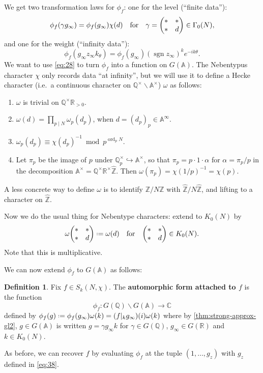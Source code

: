 \documentclass[11pt]{report}
\let\mbb\mathbb
\newcommand{\1}{\mathbbm 1}
\newcommand{\Z}{\mathbb{Z}}
\newcommand{\Q}{\mathbb{Q}}
\newcommand{\R}{\mathbb{R}}
\newcommand{\C}{\mathbb{C}}
\newcommand{\A}{\mbb A}
\newcommand*{\defeq}{\mathrel{\vcenter{\baselineskip0.5ex \lineskiplimit0pt
      \hbox{\scriptsize.}\hbox{\scriptsize.}}}%
  =}
\DeclareMathOperator{\sgn}{sgn}
\DeclareMathOperator{\ord}{ord}
\theoremstyle{plain}
\newcounter{ex}
\theoremstyle{definition}
\newtheorem{mydef}[thm]{Definition}
\theoremstyle{remark}
\numberwithin{equation}{section}
\begin{document}
We get two transformation laws for $\phi_{f}$: one for
the level (``finite data''):
\begin{equation}
  \label{eq:17}
\phi_{f}(\gamma g_{\infty}) = \phi_{f}(g_{\infty}) \chi(d) \qq{for} \gamma = \mqty(*  & * \\ * & d) \in \Gamma_{0}(N),
\end{equation}
and one for the weight (``infinity data''):
\begin{equation}
  \label{eq:18}
\phi_{f}(g_{\infty}z_{\infty}k_{\theta}) = \phi_{f}(g_{\infty})(\sgn z_{\infty})^{k}e^{-ik\theta}.
\end{equation}
We want to use \cref{eq:28} to turn $\phi_{f}$ into a function on
$G(\A)$. The Nebentypus character $\chi$ only
records data ``at infinity'', but we will use it to define a Hecke character
(i.e.~a continuous character on $\Q^{\times}\backslash \A^{\times}$) $\omega$ as follows:
\begin{enumerate}
\item $\omega$ is trivial on $\Q^{\times}\R_{>0}$.
\item $\omega(d) = \prod_{p\mid N}\omega_{p}(d_{p})$, when
  $d = (d_{p})_{p} \in \A^{\infty}$.
\item $\omega_{p}(d_{p}) \equiv \chi(d_{p})^{-1} \bmod p^{\ord_{p}N}$. 

\item Let $\pi_{p}$ be the image of $p$ under
  $\Q_{p}^{\times} \hookrightarrow \A^{\times}$, so that
  $\pi_{p} = p\cdot 1 \cdot \alpha$ for $\alpha = \pi_{p}/p$ in the decomposition
  $\A^{\times} = \Q^{\times}\R^{\times}\hat{\Z}$. Then
  $\omega(\pi_{p}) = \chi(1/p)^{-1} = \chi(p)$. 
\end{enumerate}
A less concrete way to define $\omega$ is to identify $\Z/N\Z$ with
$\hat{\Z}/N\hat{\Z}$, and lifting to a character on $\hat{\Z}$.

Now we do the usual thing for Nebentype characters: extend to $K_{0}(N)$ by
\begin{equation}
  \label{eq:32}
\omega\mqty(*  & * \\ * & d) \defeq \omega(d) \qq{for} \mqty(*  & * \\ * & d) \in K_{0}(N).
\end{equation}
Note that this is multiplicative.

We can now extend $\phi_{f}$ to $G(\A)$ as follows:
\begin{mydef}
  Fix $f \in S_{k}(N,\chi)$. The \textbf{automorphic form attached to $f$}
  is the function
  \begin{equation}
    \label{eq:33}
    \phi_{f} \colon G(\Q) \backslash G(\A) \to \C
  \end{equation}
  defined by
  $\phi_{f}(g) \defeq \phi_{f}(g_{\infty})\omega(k) = (f|_{k}g_{\infty})(i)\omega(k)$ where by
  \cref{thm:strong-approx-gl2}, $g \in G(\A)$ is written
  $g = \gamma g_{\infty} k$ for $\gamma \in G(\Q)$,
  $g_{\infty} \in G(\R)$ and $k \in K_{0}(N)$.
\end{mydef}
As before, we can recover $f$ by evaluating $\phi_{f}$ at the tuple
$(1,\ldots, g_{z})$ with $g_{z}$ defined in \cref{eq:38}.
\end{document}
